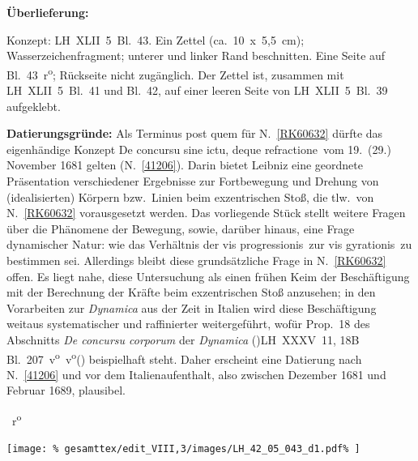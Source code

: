 %  
%
%
%
%
\frenchspacing
%
\begin{ledgroupsized}[r]{120mm}
\footnotesize
\pstart
\noindent\textbf{Überlieferung:}
\pend
\end{ledgroupsized}
%
\begin{ledgroupsized}[r]{114mm}
\footnotesize
\pstart \parindent -6mm
%
Konzept:
LH~XLII~5~Bl.~43.
Ein Zettel (ca.~10~x~5,5~cm);
Wasserzeichenfragment;
unterer und linker Rand beschnitten.
Eine Seite auf Bl.~43~r\textsuperscript{o}; Rückseite nicht zugänglich.
Der Zettel ist, zusammen mit LH~XLII~5~Bl.~41 und Bl.~42, auf einer leeren Seite von LH~XLII~5~Bl.~39 aufgeklebt.
\pend
\end{ledgroupsized}
% 
%
\vspace{5mm}
\begin{ledgroup}
\footnotesize
\pstart
\noindent%
\textbf{Datierungsgründe:}
Als Terminus post quem für N.~\ref{RK60632} dürfte das eigenhändige Konzept
%
\glqq De concursu sine ictu, deque refractione\grqq\ vom 19.\ (29.) November 1681 gelten (N.~\ref{41206}).
%
Darin bietet Leibniz eine geordnete Präsentation verschiedener Ergebnisse zur Fortbewegung und Drehung
%
von (idealisierten) Körpern bzw.\ Linien beim exzentrischen Stoß, 
%
die tlw.\ von N.~\ref{RK60632} vorausgesetzt werden.
\pend
%
\pstart
Das vorliegende Stück stellt weitere Fragen über die Phänomene der Bewegung, sowie, darüber hinaus, eine Frage dynamischer Natur:
%
wie das Verhältnis der \glqq vis progressionis\grqq\ zur \glqq vis gyrationis\grqq\ zu bestimmen sei.
%
Allerdings bleibt diese grundsätzliche Frage in N.~\ref{RK60632} offen. 
%
Es liegt nahe, diese Untersuchung als einen frühen Keim der Beschäftigung mit der Berechnung der Kräfte beim exzentrischen Stoß anzusehen;
%
in den Vorarbeiten zur \cite{01345}\textit{Dynamica} aus der Zeit in Italien wird diese Beschäftigung weitaus systematischer und raffinierter weitergeführt,
%
wofür Prop.~18 des Abschnitts \textit{De concursu corporum} der 
\cite{01345}\textit{Dynamica} (\protect\vphantom)LH~XXXV~11, 18B Bl.~207~v\textsuperscript{o}~v\textsuperscript{o}\protect\vphantom() beispielhaft steht.
\pend
%
\pstart
%
Daher erscheint eine Datierung nach N.~\ref{41206} und vor dem Italienaufenthalt, also zwischen Dezember 1681 und Februar 1689, plausibel.
%
\pend 
\end{ledgroup}
%
%
\frenchspacing
\vspace{8mm}
\pstart%
\normalsize%
\noindent%
~r\textsuperscript{o}\rbrack\
\pend
%
\vspace{1.0em} %
\centerline{%
\hfill
\texttt{[image: \%
gesamttex/edit\_VIII,3/images/LH\_42\_05\_043\_d1.pdf\%
]}%
\hfill%
\protect{}
\hfill%
} %

